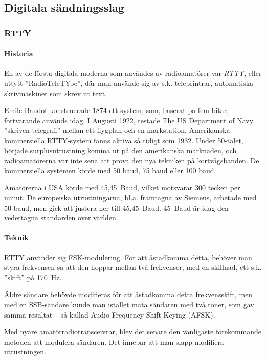 \subsection{Digitala sändningsslag}

\subsubsection{RTTY}

\paragraph{Historia}

En av de första digitala moderna som användes av radioamatörer var \emph{RTTY},
eller uttytt  ”RadioTeleTYpe”, där man använde sig av s.k. teleprintrar,
automatiska skrivmaskiner som skrev ut text.

Emile Baudot konstruerade 1874 ett system, som, baserat på fem bitar,
fortvarande används idag. 
I Augusti 1922, testade The US Department of Navy ”skriven telegrafi” mellan
ett flygplan och en markstation.
Amerikanska kommersiella RTTY-system fanns aktiva så tidigt som 1932.
Under 50-talet, började surplusutrustning komma ut på den amerikanska
marknaden, och radioamatörerna var inte sena att prova den nya tekniken på
kortvågsbanden.
De kommersiella systemen körde med 50 baud, 75 baud eller 100 baud.

Amatörerna i USA körde med 45,45~Baud, vilket motsvarar 300 tecken per minut.
De europeiska utrustningarna, bl.a. framtagna av Siemens, arbetade med 50 baud,
men gick att justera ner till 45,45~Baud.
45~Baud är idag den vedertagna standarden över världen.

\paragraph{Teknik}

RTTY använder sig FSK-modulering.
För att åstadkomma detta, behöver man styra frekvensen så att den hoppar mellan
två frekvenser, med en skillnad, ett s.k. ”skift”  på 170~Hz.

Äldre sändare behövde modifieras för att åstadkomma detta frekvensskift, men
med en SSB-sändare kunde man istället mata sändaren med två toner, som gav
samma resultat -- så kallad Audio Frequency Shift Keying (AFSK).

Med nyare amatörradiotransceivrar, blev det senare den vanligaste förekommande
metoden att modulera sändaren. 
Det innebar att man slapp modifiera utrustningen.

